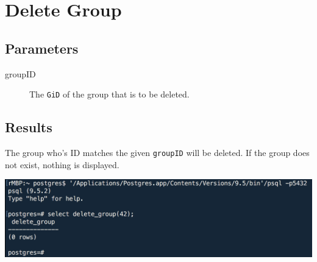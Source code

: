 \section{Delete Group}

\subsection{Parameters}
\begin{description}
    \item [groupID] The \texttt{GiD} of the group that is to be deleted.
\end{description}

\subsection{Results}
The group who's ID matches the given \texttt{groupID} will be deleted. If the group does not exist, nothing is displayed.

\begin{center}
\includegraphics[width=\columnwidth]{include/assets/screenshots/delete_group}
\end{center}




